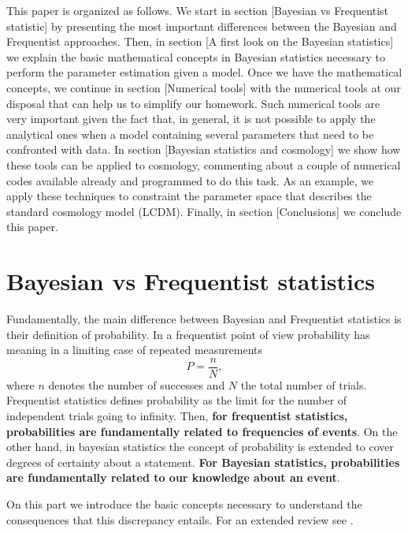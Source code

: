 \documentclass[onecolumn,           %
               showpacs,            %
               preprintnumbers,     %
               aps,                 %
               letterpaper,             %
               superscriptaddress,      %
               nofootinbib,         %
               tightenlines,        %
               floats,floatfix      %
               ,usenatbib,
               ]{revtex4-1}
\begin{document}
This paper is organized as follows. We start in section [Bayesian vs Frequentist statistic] by presenting the most important differences between the Bayesian and Frequentist approaches. Then, in section [A first look on the Bayesian statistics] we explain the basic mathematical concepts in Bayesian statistics necessary to perform the parameter estimation given a model. Once we have the mathematical concepts, we continue in section [Numerical tools] with the numerical tools at our disposal that can help us to simplify our homework. Such numerical tools are very important given the fact that, in general, it is not possible to apply the analytical ones when a model containing several parameters that need to be confronted with data. In section [Bayesian statistics and cosmology] we show how these tools can be applied to cosmology, commenting about a couple of numerical codes available already and programmed to do this task. As an example, we apply these techniques to constraint the parameter space that describes the standard cosmology model (LCDM). Finally, in section [Conclusions] we conclude this paper.

\section{Bayesian vs Frequentist statistics}

Fundamentally, the main difference between Bayesian and Frequentist statistics is their definition of probability. In a frequentist point of view probability has meaning in a limiting case of repeated measurements
\begin{equation}
P=\frac{n}{N},
\end{equation}
where $n$ denotes the number of successes and $N$ the total number of trials. Frequentist statistics defines probability as the limit for the number of independent trials going to infinity. Then, \textbf{for frequentist statistics, probabilities are fundamentally related to frequencies of events}. On the other hand, in bayesian statistics the concept of probability is extended to cover degrees of certainty about a statement. \textbf{For Bayesian statistics, probabilities are fundamentally related to our knowledge about an event}.

On this part we introduce the basic concepts necessary to understand the consequences that this discrepancy entails. For an extended review see \cite{bayeslecture, AlanH, RobT, LiV, RobTr}. 
\end{document}
